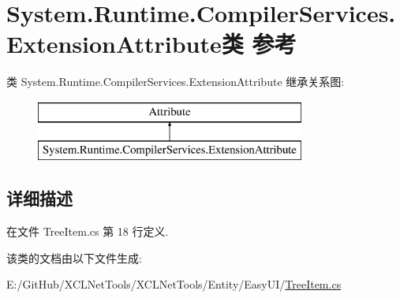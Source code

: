 \hypertarget{class_system_1_1_runtime_1_1_compiler_services_1_1_extension_attribute}{}\section{System.\+Runtime.\+Compiler\+Services.\+Extension\+Attribute类 参考}
\label{class_system_1_1_runtime_1_1_compiler_services_1_1_extension_attribute}
类 System.\+Runtime.\+Compiler\+Services.\+Extension\+Attribute 继承关系图\+:\begin{figure}[H]
\begin{center}
\leavevmode
\includegraphics[height=2.000000cm]{class_system_1_1_runtime_1_1_compiler_services_1_1_extension_attribute}
\end{center}
\end{figure}


\subsection{详细描述}


在文件 Tree\+Item.\+cs 第 18 行定义.



该类的文档由以下文件生成\+:\begin{DoxyCompactItemize}
\item 
E\+:/\+Git\+Hub/\+X\+C\+L\+Net\+Tools/\+X\+C\+L\+Net\+Tools/\+Entity/\+Easy\+U\+I/\hyperlink{_tree_item_8cs}{Tree\+Item.\+cs}\end{DoxyCompactItemize}

